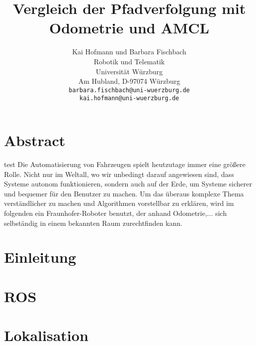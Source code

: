 \documentclass[11pt,a4paper]{article}
\begin{document}
\sloppy
	



\title{\Large\bf Vergleich der Pfadverfolgung mit Odometrie und AMCL }

\author{Kai Hofmann und Barbara Fischbach\\
  Robotik und Telematik \\
  Universit\"at W\"urzburg\\
  Am Hubland, D-97074 W\"urzburg\\
{\small \texttt{barbara.fischbach@uni-wuerzburg.de}}\\
{\small \texttt{kai.hofmann@uni-wuerzburg.de}}}

\date{}




\maketitle

\newpage

\tableofcontents{}

\newpage

\twocolumn

\section*{Abstract}
{
test
Die Automatisierung von Fahrzeugen spielt heutzutage immer eine gr\"o\ss{}ere Rolle. Nicht nur im Weltall, wo wir unbedingt darauf angewiesen sind, dass Systeme autonom funktionieren, sondern auch auf der Erde, um Systeme sicherer und bequemer f\"ur den Benutzer zu machen. Um das überaus komplexe Thema verst\"andlicher zu machen und Algorithmen vorstellbar zu erkl\"aren, wird im folgenden ein Fraunhofer-Roboter benutzt, der anhand Odometrie,... sich selbst\"andig in einem bekannten Raum zurechtfinden kann.}


\section{Einleitung}

\section{ROS}

\section{Lokalisation}
\end{document}
